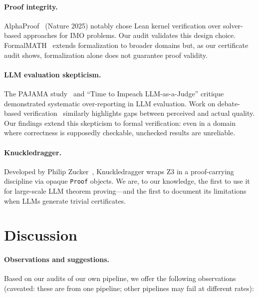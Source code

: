 \documentclass[11pt]{article}
\begin{document}
\paragraph{Proof integrity.}
AlphaProof~\cite{alphaproof2025} (Nature 2025) notably chose Lean kernel verification over solver-based approaches for IMO problems. Our audit validates this design choice. FormalMATH~\cite{formalmath2025} extends formalization to broader domains but, as our certificate audit shows, formalization alone does not guarantee proof validity.

\paragraph{LLM evaluation skepticism.}
The PAJAMA study~\cite{pajama2025} and ``Time to Impeach LLM-as-a-Judge'' critique~\cite{impeach2025} demonstrated systematic over-reporting in LLM evaluation. Work on debate-based verification~\cite{debateskepticism2025} similarly highlights gaps between perceived and actual quality. Our findings extend this skepticism to formal verification: even in a domain where correctness is supposedly checkable, unchecked results are unreliable.

\paragraph{Knuckledragger.}
Developed by Philip Zucker~\cite{knuckledragger2026}, Knuckledragger wraps Z3 in a proof-carrying discipline via opaque \texttt{Proof} objects. We are, to our knowledge, the first to use it for large-scale LLM theorem proving---and the first to document its limitations when LLMs generate trivial certificates.

\section{Discussion}\label{sec:discussion}

\paragraph{Observations and suggestions.} Based on our audits of our own pipeline, we offer the following observations (caveated: these are from one pipeline; other pipelines may fail at different rates):
\end{document}
